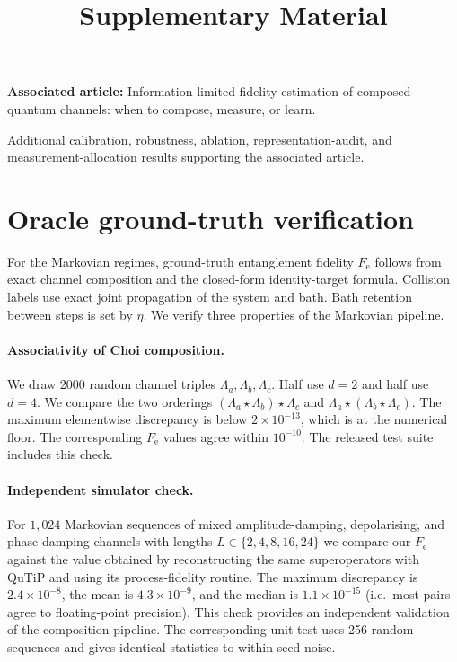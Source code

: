 \documentclass[10pt]{article}
\title{\textbf{Supplementary Material}}
\author{}
\date{}
\begin{document}
\maketitle
\noindent\textbf{Associated article:} Information-limited fidelity estimation of composed quantum channels: when to compose, measure, or learn.

\medskip
\noindent Additional calibration, robustness, ablation, representation-audit, and measurement-allocation results supporting the associated article.


\section{Oracle ground-truth verification}
\label{supp:oracle}

For the Markovian regimes, ground-truth entanglement fidelity $F_{\mathrm{e}}$ follows from exact channel composition and the closed-form identity-target formula. Collision labels use exact joint propagation of the system and bath. Bath retention between steps is set by $\eta$. We verify three properties of the Markovian pipeline.

\paragraph*{Associativity of Choi composition.}
We draw 2000 random channel triples $\Lambda_a, \Lambda_b, \Lambda_c$. Half use $d=2$ and half use $d=4$. We compare the two orderings $(\Lambda_a \star \Lambda_b) \star \Lambda_c$ and $\Lambda_a \star (\Lambda_b \star \Lambda_c)$. The maximum elementwise discrepancy is below $2\times10^{-13}$, which is at the numerical floor. The corresponding $F_{\mathrm{e}}$ values agree within $10^{-10}$. The released test suite includes this check.

\paragraph*{Independent simulator check.}
For $1{,}024$ Markovian sequences of mixed amplitude-damping, depolarising, and phase-damping channels with lengths $L \in \{2, 4, 8, 16, 24\}$ we compare our $F_{\mathrm{e}}$ against the value obtained by reconstructing the same superoperators with QuTiP and using its process-fidelity routine. The maximum discrepancy is $2.4 \times 10^{-8}$, the mean is $4.3 \times 10^{-9}$, and the median is $1.1 \times 10^{-15}$ (i.e.~most pairs agree to floating-point precision). This check provides an independent validation of the composition pipeline. The corresponding unit test uses 256 random sequences and gives identical statistics to within seed noise.
\end{document}
